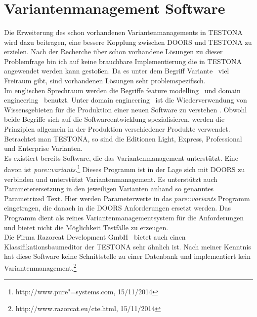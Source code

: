 \newpage
\hspace{2cm}
\newpage
\section{Variantenmanagement Software}
\paragraph{}
Die Erweiterung des schon vorhandenen Variantenmanagements in TESTONA wird dazu beitragen, eine bessere Kopplung zwischen DOORS und TESTONA zu erzielen. Nach der Recherche über schon vorhandene Lösungen zu dieser Problemfrage bin ich auf keine brauchbare Implementierung die in TESTONA angewendet werden kann gestoßen. Da es unter dem Begriff \glqq Variante\grqq~ viel Freiraum gibt, sind vorhandenen Lösungen sehr problemspezifisch.\\


Im englischen Sprechraum werden die Begriffe \glqq feature modelling\grqq~ und \glqq domain engineering\grqq~ benutzt. Unter \glqq domain engineering\grqq~ ist die Wiederverwendung von Wissensgebieten für die Produktion einer neuen Software zu verstehen \cite{DomainEng}. Obwohl beide Begriffe sich auf die Softwareentwicklung spezialisieren, werden die Prinzipien allgemein in der Produktion verschiedener Produkte verwendet. Betrachtet man TESTONA, so sind die Editionen Light, Express, Professional und Enterprise Varianten.\\


Es existiert bereits Software, die das Variantenmanagement unterstützt. Eine davon ist \textit{pure::variants}.\footnote{http://www.pure"=systems.com, 15/11/2014} Dieses Programm ist in der Lage sich mit DOORS zu verbinden und unterstützt Variantenmanagement. Es unterstützt auch Parameterersetzung in den jeweiligen Varianten anhand so genanntes \glqq Parametrized Text\grqq. Hier werden Parameterwerte in das \textit{pure::variants} Programm eingetragen, die danach in die DOORS Anforderungen ersetzt werden. Das Programm dient als reines Variantenmanagementsystem für die Anforderungen und bietet nicht die Möglichkeit Testfälle zu erzeugen. \\


Die Firma \glqq Razorcat Development GmbH\grqq~ bietet auch einen Klassifikationsbaumeditor der TESTONA sehr ähnlich ist. Nach meiner Kenntnis hat diese Software keine Schnittstelle zu einer Datenbank und implementiert kein Variantenmanagement.\footnote{http://www.razorcat.eu/cte.html, 15/11/2014}



